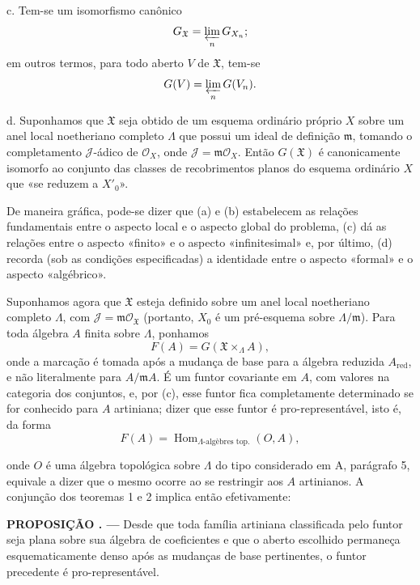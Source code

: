 \documentclass[11pt,twoside,openany]{book}
\numberwithin{equation}{section}
\newcommand{\src}[1]{%
  \phantomsection\hypertarget{src:#1}{}%
  \marginpar{\raggedleft\footnotesize\sffamily #1}%
}
\theoremstyle{plain}
\theoremstyle{definition}
\theoremstyle{remark}
\newcommand{\result}[2]{%
  \par\medskip\noindent\textbf{#1%
  \if\relax\detokenize{#2}\relax\else\space#2\fi. ---}\enspace
}
\newcommand{\FgaUnitKey}{frontmatter}
\renewcommand{\src}[1]{%
  \phantomsection\hypertarget{src:\FgaUnitKey:#1}{}%
  \marginpar{\raggedleft\footnotesize\sffamily #1}%
}
\begin{document}
\noindent c. Tem-se um isomorfismo canônico
\[
  G_{\mathfrak X}=\varprojlim_nG_{X_n} ;
\]
em outros termos, para todo aberto $V$ de $\mathfrak X$, tem-se
\[
  G(V)=\varprojlim_nG(V_n).
\]

\noindent d. Suponhamos que $\mathfrak X$ seja obtido de um esquema ordinário
próprio $X$ sobre um anel local noetheriano completo $\Lambda$ que possui um
ideal de definição $\mathfrak m$, tomando o completamento $\mathcal J$-ádico de
$\mathcal O_X$, onde $\mathcal J=\mathfrak m\mathcal O_X$. Então
$G(\mathfrak X)$ é canonicamente isomorfo ao conjunto das classes de
recobrimentos planos do esquema ordinário $X$ que «se reduzem a $X'_0$».

De maneira gráfica, pode-se dizer que (a) e (b) estabelecem as relações
fundamentais entre o aspecto local e o aspecto global do problema, (c) dá
as relações entre o aspecto «finito» e o aspecto «infinitesimal» e, por
último, (d) recorda (sob as condições especificadas) a identidade entre o
aspecto «formal» e o aspecto «algébrico».

Suponhamos agora que $\mathfrak X$ esteja definido sobre um anel local
noetheriano completo $\Lambda$, com
$\mathcal J=\mathfrak m\mathcal O_{\mathfrak X}$ (portanto, $X_0$ é um
pré-esquema sobre $\Lambda/\mathfrak m$). Para toda álgebra $A$ finita sobre
$\Lambda$, ponhamos
\[
  F(A)=G(\mathfrak X\times_\Lambda A),
\]
onde a marcação é tomada após a mudança de base para a álgebra reduzida $A_{\mathrm{red}}$, e não literalmente para $A/\mathfrak mA$. É um funtor covariante em $A$, com valores na categoria dos conjuntos,
e, por (c), esse funtor fica completamente determinado se for conhecido para $A$
artiniana; dizer que esse funtor é pro-representável, isto é, da forma
\[
  F(A)=\operatorname{Hom}_{\Lambda\text{-algèbres top.}}(O,A),
\]

\src{389}
onde $O$ é uma álgebra topológica sobre $\Lambda$ do tipo considerado em A,
parágrafo 5, equivale a dizer que o mesmo ocorre ao se restringir aos $A$
artinianos. A conjunção dos teoremas 1 e 2 implica então efetivamente:

\result{PROPOSIÇÃO}{5.1} Desde que toda família artiniana classificada pelo funtor seja plana sobre sua álgebra de coeficientes e que o aberto escolhido permaneça esquematicamente denso após as mudanças de base pertinentes, o funtor precedente é pro-representável.
\end{document}
